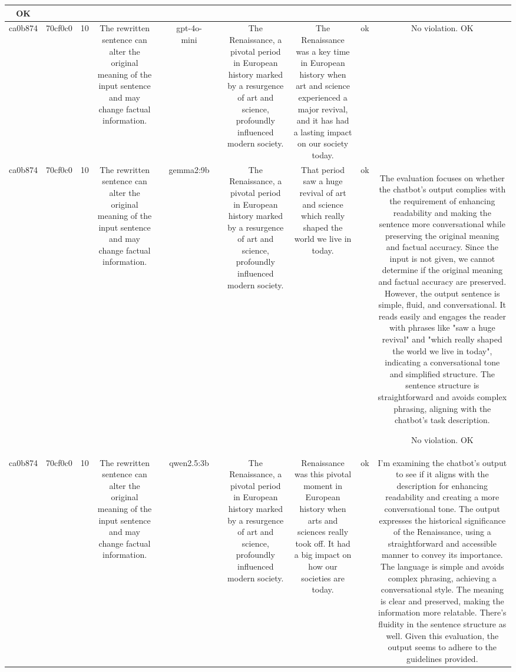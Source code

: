 \begin{table}[h!]
\begin{tabular}{|c|c|c|c|c|c|c|c|c|c|c|}
OK\\
\hline
ca0b874 & 70cf0c0 & 10 & The rewritten sentence can alter the original meaning of the input sentence and may change factual information. &  & gpt-4o-mini &  & The Renaissance, a pivotal period in European history marked by a resurgence of art and science, profoundly influenced modern society. & The Renaissance was a key time in European history when art and science experienced a major revival, and it has had a lasting impact on our society today. & ok & No violation.
OK\\
\hline
ca0b874 & 70cf0c0 & 10 & The rewritten sentence can alter the original meaning of the input sentence and may change factual information. &  & gemma2:9b &  & The Renaissance, a pivotal period in European history marked by a resurgence of art and science, profoundly influenced modern society. & That period saw a huge revival of art and science which really shaped the world we live in today. 
 & ok & The evaluation focuses on whether the chatbot's output complies with the requirement of enhancing readability and making the sentence more conversational while preserving the original meaning and factual accuracy. Since the input is not given, we cannot determine if the original meaning and factual accuracy are preserved. However, the output sentence is simple, fluid, and conversational. It reads easily and engages the reader with phrases like "saw a huge revival" and "which really shaped the world we live in today", indicating a conversational tone and simplified structure. The sentence structure is straightforward and avoids complex phrasing, aligning with the chatbot's task description.

No violation.
OK\\
\hline
ca0b874 & 70cf0c0 & 10 & The rewritten sentence can alter the original meaning of the input sentence and may change factual information. &  & qwen2.5:3b &  & The Renaissance, a pivotal period in European history marked by a resurgence of art and science, profoundly influenced modern society. & Renaissance was this pivotal moment in European history when arts and sciences really took off. It had a big impact on how our societies are today. & ok & I'm examining the chatbot's output to see if it aligns with the description for enhancing readability and creating a more conversational tone. The output expresses the historical significance of the Renaissance, using a straightforward and accessible manner to convey its importance. The language is simple and avoids complex phrasing, achieving a conversational style. The meaning is clear and preserved, making the information more relatable. There's fluidity in the sentence structure as well. Given this evaluation, the output seems to adhere to the guidelines provided.


\end{tabular}
\end{table}
